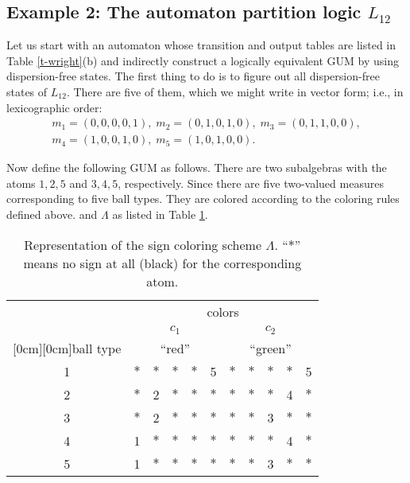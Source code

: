 \subsection{Example 2: The automaton partition logic $L_{12}$}
Let us start with
an automaton whose transition and output tables are listed in Table  \ref{t-wright}(b)
and indirectly construct a logically equivalent GUM by using dispersion-free states.
The first thing to do is to figure out all dispersion-free states of $L_{12}$.
There are five of them, which we might write in vector form; i.e., in lexicographic order:
\begin{equation}
\begin{array}{c}
m_1= (0,0,0,0,1),\;
m_2= (0,1,0,1,0),\;
m_3= (0,1,1,0,0), \\
m_4= (1,0,0,1,0), \;
m_5= (1,0,1,0,0).
\end{array}  \nonumber
\end{equation}

Now define the following GUM as follows.
There are two subalgebras with the atoms $1,2,5$ and $3,4,5$, respectively.
Since there are five two-valued measures corresponding to five ball types.
They are colored according to the coloring rules defined above.
and $\Lambda$ as listed in Table
\ref{t-wright1}.
\begin{table}
\begin{center}
\begin{tabular}{|c|ccccc|ccccc|}
\hline\hline
&\multicolumn{10}{c|}{colors}\\
& \multicolumn{5}{c}{$c_1$}  & \multicolumn{5}{c|}{$c_2$}   \\
\raisebox{2.5ex}[0cm][0cm]{ball type} & \multicolumn{5}{c}{``red''}& \multicolumn{5}{c|}{``green''}   \\ \hline
1  & $\ast $& $\ast $ &$\ast $&$\ast$& 5      & $\ast $&$\ast$& $\ast $& $\ast$ & 5 \\
2  & $\ast $& 2       &$\ast $&$\ast$& $\ast$ & $\ast $&$\ast$& $\ast $& 4      & $\ast$ \\
3  & $\ast $& 2       &$\ast $&$\ast$& $\ast$ & $\ast $&$\ast$& 3      & $\ast $& $\ast$ \\
4  & 1      & $ \ast $&$\ast $&$\ast$& $\ast$ & $\ast $&$\ast$& $\ast$ & 4      & $\ast$ \\
5  & 1      & $ \ast $&$\ast $&$\ast$& $\ast$ & $\ast $&$\ast$& 3      & $\ast $& $\ast$ \\
\hline\hline
\end{tabular}
\end{center}
\caption{\label{t-wright1} Representation of the sign coloring scheme $\Lambda$.
``$\ast$'' means no sign at all (black) for the corresponding atom.}
\end{table}

